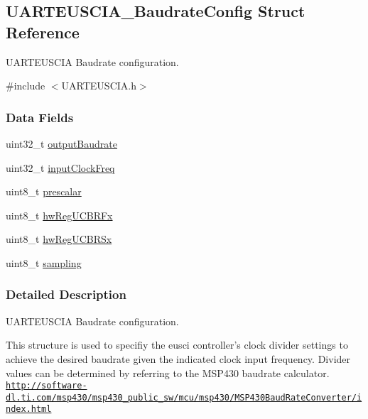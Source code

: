 \subsection{U\-A\-R\-T\-E\-U\-S\-C\-I\-A\-\_\-\-Baudrate\-Config Struct Reference}
\label{struct_u_a_r_t_e_u_s_c_i_a___baudrate_config}


U\-A\-R\-T\-E\-U\-S\-C\-I\-A Baudrate configuration.  




{\ttfamily \#include $<$U\-A\-R\-T\-E\-U\-S\-C\-I\-A.\-h$>$}

\subsubsection*{Data Fields}
\begin{DoxyCompactItemize}
\item 
uint32\-\_\-t \hyperlink{struct_u_a_r_t_e_u_s_c_i_a___baudrate_config_ada91b2d393daca5c8f17637811729eba}{output\-Baudrate}
\item 
uint32\-\_\-t \hyperlink{struct_u_a_r_t_e_u_s_c_i_a___baudrate_config_a3ab151619c7b7f4f8f568f340616a534}{input\-Clock\-Freq}
\item 
uint8\-\_\-t \hyperlink{struct_u_a_r_t_e_u_s_c_i_a___baudrate_config_acd9d45cff4ae80010082867aa49e6e08}{prescalar}
\item 
uint8\-\_\-t \hyperlink{struct_u_a_r_t_e_u_s_c_i_a___baudrate_config_a486441ac0287eee5d2f1cec429ca7a84}{hw\-Reg\-U\-C\-B\-R\-Fx}
\item 
uint8\-\_\-t \hyperlink{struct_u_a_r_t_e_u_s_c_i_a___baudrate_config_a644a24cfb8503deef280eb7142e98cbf}{hw\-Reg\-U\-C\-B\-R\-Sx}
\item 
uint8\-\_\-t \hyperlink{struct_u_a_r_t_e_u_s_c_i_a___baudrate_config_a9c18d479e91a0b5258fcd1821c09cf2e}{sampling}
\end{DoxyCompactItemize}


\subsubsection{Detailed Description}
U\-A\-R\-T\-E\-U\-S\-C\-I\-A Baudrate configuration. 

This structure is used to specifiy the eusci controller's clock divider settings to achieve the desired baudrate given the indicated clock input frequency. Divider values can be determined by referring to the M\-S\-P430 baudrate calculator. \href{http://software-dl.ti.com/msp430/msp430_public_sw/mcu/msp430/MSP430BaudRateConverter/index.html}{\tt http\-://software-\/dl.\-ti.\-com/msp430/msp430\-\_\-public\-\_\-sw/mcu/msp430/\-M\-S\-P430\-Baud\-Rate\-Converter/index.\-html}

